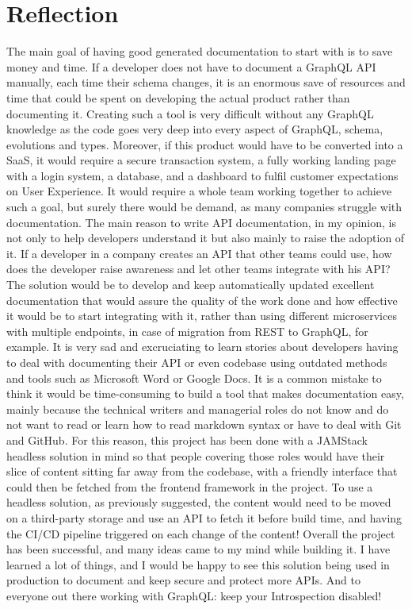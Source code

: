 \section{Reflection}
\label{s:Reflection}

The main goal of having good generated documentation to start with is to save
money and time. If a developer does not have to document a GraphQL API manually,
each time their schema changes, it is an enormous save of resources and time
that could be spent on developing the actual product rather than documenting it.
Creating such a tool is very difficult without any GraphQL knowledge as the code
goes very deep into every aspect of GraphQL, schema, evolutions and types.
Moreover, if this product would have to be converted into a SaaS, it would
require a secure transaction system, a fully working landing page with a login
system, a database, and a dashboard to fulfil customer expectations on User
Experience. It would require a whole team working together to achieve such a
goal, but surely there would be demand, as many companies struggle with
documentation. The main reason to write API documentation, in my opinion, is not
only to help developers understand it but also mainly to raise the adoption of
it. If a developer in a company creates an API that other teams could use, how
does the developer raise awareness and let other teams integrate with his API?
The solution would be to develop and keep automatically updated excellent
documentation that would assure the quality of the work done and how effective
it would be to start integrating with it, rather than using different
microservices with multiple endpoints, in case of migration from REST to GraphQL,
for example. It is very sad and excruciating to learn stories about developers
having to deal with documenting their API or even codebase using outdated
methods and tools such as Microsoft Word or Google Docs. It is a common mistake
to think it would be time-consuming to build a tool that makes documentation
easy, mainly because the technical writers and managerial roles do not know and
do not want to read or learn how to read markdown syntax or have to deal with
Git and GitHub. For this reason, this project has been done with a JAMStack
headless solution in mind so that people covering those roles would have their
slice of content sitting far away from the codebase, with a friendly interface
that could then be fetched from the frontend framework in the project. To use a
headless solution, as previously suggested, the content would need to be moved
on a third-party storage and use an API to fetch it before build time, and
having the CI/CD pipeline triggered on each change of the content! Overall the
project has been successful, and many ideas came to my mind while building it. I
have learned a lot of things, and I would be happy to see this solution being
used in production to document and keep secure and protect more APIs. And to
everyone out there working with GraphQL: keep your Introspection disabled!
